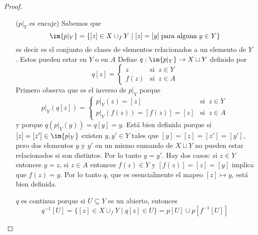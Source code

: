 \begin{proof}
\begin{enumerate}
\begin{enumerate}
  \end{enumerate}

\item[($p|_Y$ es encaje)] Sabemos que
  \[
    \im{p|_Y}=\{[z]\in X\cup_f Y\mid [z]=[y]\;\text{para alguna}\; y\in Y\}
  \]
  es decir es el conjunto de clases de elementos relacionados a un elemento de $Y$.
  Estos pueden estar en $Y$ o en $A$
  Define $q:\im{p|_Y}\ra X\sqcup Y$ definido por
  \[
    q[z]=
    \begin{cases}
      z &\text{si}\;\; z\in Y\\
      f(z) &\text{si}\;\; z\in A
    \end{cases}
  \]
  Primero observa que es el inverso de $p|_Y$ porque
  \[
    p|_Y(q[z])=
    \begin{cases}
      p|_Y(z)=[z] &\text{si}\;\; z\in Y\\
      p|_Y(f(z))=[f(z)]=[z] &\text{si}\;\; z\in A
    \end{cases}
  \]
  y porque $q(p|_Y(y))=q[y]=y$. Est\'a bien definida porque si $[z]=[z']\in\im{p|_Y}$
  existen $y,y'\in Y$ tales que $[y]=[z]=[z']=[y']$, pero dos elementos $y$ y $y'$
  en un mismo sumando de $X\sqcup Y$ no pueden estar relacionados si son distintos.
  Por lo tanto $y=y'$. Hay dos casos: si $z\in Y$ entonces $y=z$, si $z\in A$ entonces
  $f(z)\in Y$ y $[f(z)]=[z]=[y]$ implica que $f(z)=y$. Por lo tanto $q$, que es esencialmente
  el mapeo $[z]\mapsto y$, est\'a bien definida.

  $q$ es continua porque si $U\subseteq Y$ es un abierto, entonces
  \[
    q^{-1}[U]=\{[z]\in X\cup_f Y\mid q[z]\in U\}=p[U]\cup p[f^{-1}[U]]
  \]
  

  
  
  \end{enumerate}  
\end{proof}%

